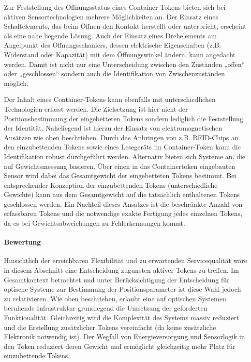Zur Feststellung des Öffnungsstatus eines Container-Tokens bieten sich bei aktiven Sensortechnologien mehrere Möglichkeiten an. Der Einsatz eines Schaltelements, das beim Öffnen den Kontakt herstellt oder unterbricht, erscheint als eine nahe liegende Lösung. Auch der Einsatz eines Drehelements am Angelpunkt des Öffnungsschaniers, dessen elektrische Eigenschaften (z.B. Widerstand oder Kapazität) mit dem Öffnungswinkel ändern, kann angedacht werden. Damit ist nicht nur eine Unterscheidung zwischen den Zuständen „offen“ oder „geschlossen“ sondern auch die Identifikation von Zwischenzuständen möglich.

Der Inhalt eines Container-Tokens kann ebenfalls mit unterschiedlichen Technologien erfasst werden. Die Zielsetzung ist hier nicht der Positionsbestimmung der eingebetteten Tokens sondern lediglich die Feststellung der Identität. Naheliegend ist hierzu der Einsatz von elektromagnetischen Ansätzen wie oben beschrieben. Durch das Anbringen von z.B. \gls{RFID}-Chips an den einzubettenden Tokens sowie eines Lesegeräts im Container-Token kann die Identifikation robust durchgeführt werden. Alternativ bieten sich Systeme an, die auf Gewichtsmessung basieren. Über einen in das Containertoken eingebauten Sensor wird dabei das Gesamtgewicht der eingebetteten Tokens bestimmt. Bei entsprechender Konzeption der einzubettenden Tokens (unterschiedliche Gewichte) kann aus dem Gesamtgewicht auf die tatsächlich enthaltenen Tokens geschlossen werden. Ein Nachteil dieses Ansatzes ist die beschränkte Anzahl von erfassbaren Tokens und die notwendige exakte Fertigung jedes einzelnen Tokens, da es bei Gewichtsabweichungen zu Fehlerkennungen kommt.


\paragraph{Bewertung} %
\label{par:zustand_bewertung}

Hinsichtlich der erreichbaren Flexibilität und zu erwartenden Servicequalität wäre in diesem Abschnitt eine Entscheidung zugunsten aktiver Tokens zu treffen. Im Gesamtkontext betrachtet und unter Berücksichtigung der Entscheidung für optische Systeme zur Bestimmung der Positionsparameter ist diese Wahl jedoch zu relativieren. Wie oben beschrieben, erlaubt eine auf optischen Systemen beruhende Infrastruktur grundlegend die Umsetzung der geforderten Funktionalität. Gleichzeitig wird die Komplexität des Systems massiv reduziert und die Erstellung zusätzlicher Tokens vereinfacht (da keine zusätzliche Elektronik notwendig ist). Der Wegfall von Energieversorgung und Sensorlogik in den Token reduziert deren Gewicht und ermöglicht gleichzeitig mehr Platz für einzubettende Tokens.

